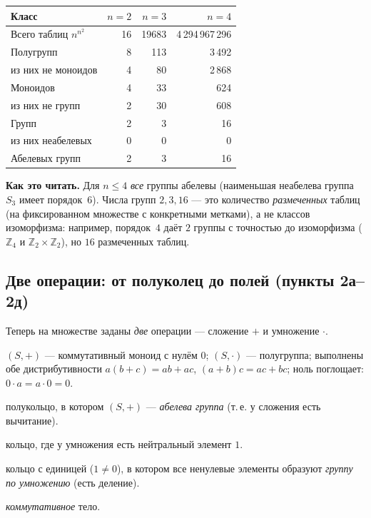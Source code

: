 \documentclass[11pt]{article}
\begin{document}
\begin{idea}
\centering
\begin{tabular}{l r r r}
\toprule
\textbf{Класс} & $n=2$ & $n=3$ & $n=4$\\
\midrule
Всего таблиц $n^{n^2}$        & 16 & 19683 & 4\,294\,967\,296\\
Полугрупп                     & 8  & 113   & 3\,492\\
\quad из них не моноидов      & 4  & 80    & 2\,868\\
Моноидов                      & 4  & 33    & 624\\
\quad из них не групп         & 2  & 30    & 608\\
Групп                         & 2  & 3     & 16\\
\quad из них неабелевых       & 0  & 0     & 0\\
Абелевых групп                & 2  & 3     & 16\\
\bottomrule
\end{tabular}
\end{idea}

\noindent\textbf{Как это читать.} Для $n\le 4$ \emph{все} группы абелевы (наименьшая
неабелева группа $S_3$ имеет порядок~$6$). Числа групп $2,3,16$ — это количество
\emph{размеченных} таблиц (на фиксированном множестве с конкретными метками), а не классов
изоморфизма: например, порядок~$4$ даёт $2$ группы с точностью до изоморфизма
($\mathbb{Z}_4$ и $\mathbb{Z}_2\times\mathbb{Z}_2$), но $16$ размеченных таблиц.

\subsection{Две операции: от полуколец до полей (пункты 2а–2д)}

Теперь на множестве заданы \emph{две} операции — сложение $+$ и умножение $\cdot$.

\begin{description}[leftmargin=2.2em, style=nextline]
  \item[Полукольцо] $(S,+)$ — коммутативный моноид с нулём $0$; $(S,\cdot)$ —
        полугруппа; выполнены обе дистрибутивности
        $a(b+c)=ab+ac$, $(a+b)c=ac+bc$; ноль поглощает: $0\cdot a=a\cdot 0=0$.
  \item[Кольцо] полукольцо, в котором $(S,+)$ — \emph{абелева группа}
        (т.\,е. у сложения есть вычитание).
  \item[Кольцо с единицей] кольцо, где у умножения есть нейтральный элемент $1$.
  \item[Тело] кольцо с единицей ($1\neq 0$), в котором все ненулевые элементы образуют
        \emph{группу по умножению} (есть деление).
  \item[Поле] \emph{коммутативное} тело.
\end{description}
\end{document}
